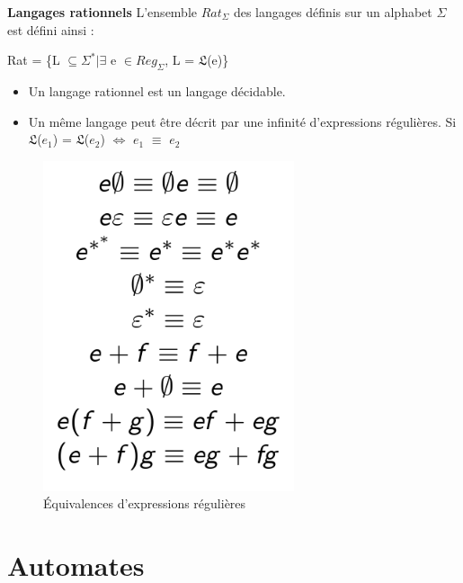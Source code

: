 \documentclass{article}
\begin{document}
\newpage
\textbf{Langages rationnels}\newline
L'ensemble $Rat_{\Sigma}$ des langages définis sur un alphabet $\Sigma$ est défini ainsi :
\begin{center}
    \item Rat = \{L $\subseteq \Sigma^{*} | \exists$ e $\in Reg_{\Sigma}$, L = $\mathfrak{L}$(e)\}
\end{center}
\begin{itemize}
    \item Un langage rationnel est un langage décidable.
    \item Un même langage peut être décrit par une infinité d'expressions régulières. Si $\mathfrak{L}$($e_{1}$) = $\mathfrak{L}$($e_{2}$) $\Longleftrightarrow$ $e_{1}$ $\equiv$ $e_{2}$
\end{itemize}
\begin{figure}[h]
    \centering
    \includegraphics[scale=0.3]{Image3.png}
    \caption{Équivalences d'expressions régulières}
\end{figure}
\newpage
\section{Automates}
\end{document}
